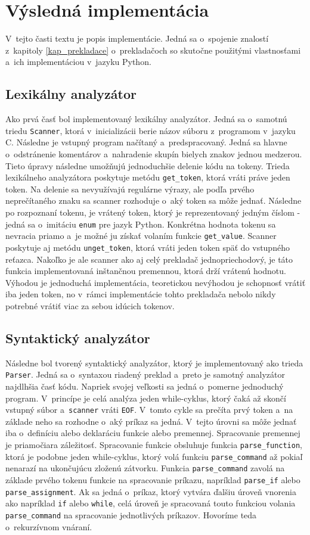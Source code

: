 \section{Výsledná implementácia}
V~tejto časti textu je popis implementácie. Jedná sa o~spojenie znalostí z~kapitoly \ref{kap_prekladace} o~prekladačoch so skutočne použitými vlastnosťami a~ich implementáciou v~jazyku Python.
\subsection{Lexikálny analyzátor}
Ako prvá časť bol implementovaný lexikálny analyzátor. Jedná sa o~samotnú triedu \texttt{Scanner}, ktorá v~inicializácii berie názov súboru z~programom v~jazyku C. Následne je vstupný program načítaný a~predspracovaný. Jedná sa hlavne o~odstránenie komentárov a~nahradenie skupín bielych znakov jednou medzerou. Tieto úpravy následne umožňujú jednoduchšie delenie kódu na tokeny. Trieda lexikálneho analyzátora poskytuje metódu \texttt{get\_token}, ktorá vráti práve jeden token. Na delenie sa nevyužívajú regulárne výrazy, ale podľa prvého neprečítaného znaku sa scanner rozhoduje o~aký token sa môže jednať. Následne po rozpoznaní tokenu, je vrátený token, ktorý je reprezentovaný jedným číslom - jedná sa o~imitáciu \texttt{enum} pre jazyk Python. Konkrétna hodnota tokenu sa nevracia priamo a~je možné ju získať volaním funkcie \texttt{get\_value}. Scanner poskytuje aj metódu \texttt{unget\_token}, ktorá vráti jeden token späť do vstupného reťazca. Nakoľko je ale scanner ako aj celý prekladač jednopriechodový, je táto funkcia implementovaná inštančnou premennou, ktorá drží vrátenú hodnotu. Výhodou je jednoduchá implementácia, teoretickou nevýhodou je schopnosť vrátiť iba jeden token, no v~rámci implementácie tohto prekladača nebolo nikdy potrebné vrátiť viac za sebou idúcich tokenov.

\subsection{Syntaktický analyzátor}
Následne bol tvorený syntaktický analyzátor, ktorý je implementovaný ako trieda \texttt{Parser}. Jedná sa o~syntaxou riadený preklad a~preto je samotný analyzátor najdlhšia časť kódu. Napriek svojej veľkosti sa jedná o~pomerne jednoduchý program. V~princípe je celá analýza jeden while-cyklus, ktorý čaká až skončí vstupný súbor a~\texttt{scanner} vráti \texttt{EOF}. V~tomto cykle sa prečíta prvý token a~na základe neho sa rozhodne o~aký príkaz sa jedná. V~tejto úrovni sa môže jednať iba o~definíciu alebo deklaráciu funkcie alebo premennej. Spracovanie premennej je priamočiara záležitosť. Spracovanie funkcie obsluhuje funkcia \texttt{parse\_function}, ktorá je podobne jeden while-cyklus, ktorý volá funkciu \texttt{parse\_command} až pokiaľ nenarazí na ukončujúcu zloženú zátvorku. Funkcia \texttt{parse\_command} zavolá 
na základe prvého tokenu funkcie na spracovanie príkazu, napríklad \texttt{parse\_if} alebo \texttt{parse\_assignment}. Ak sa jedná o~príkaz, ktorý vytvára ďalšiu úroveň vnorenia ako napríklad \texttt{if} alebo \texttt{while}, celá úroveň je spracovaná touto funkciou volania  \texttt{parse\_command} na spracovanie jednotlivých príkazov. Hovoríme teda o~rekurzívnom vnáraní.

